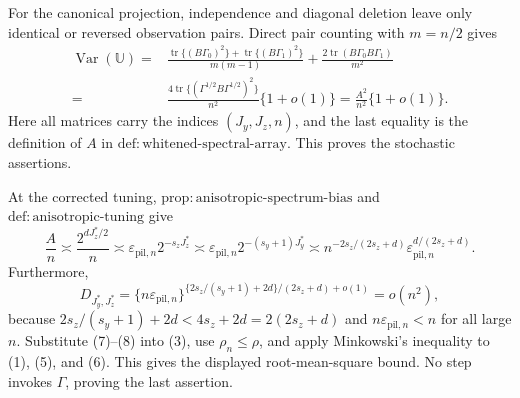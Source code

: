 For the canonical projection, independence and diagonal deletion leave only identical or reversed observation pairs. Direct pair counting with \(m=n/2\) gives
\[
\begin{split}
\operatorname{Var}(\mathbb U)
={}&\frac{\operatorname{tr}\{(B\Gamma_0)^2\}+\operatorname{tr}\{(B\Gamma_1)^2\}}{m(m-1)}
+\frac{2\operatorname{tr}(B\Gamma_0B\Gamma_1)}{m^2}\\
={}&\frac{4\operatorname{tr}\{(\Gamma^{1/2}B\Gamma^{1/2})^2\}}{n^2}\{1+o(1)\}
=\frac{A^2}{n^2}\{1+o(1)\}.
\end{split}\tag{6}
\]
Here all matrices carry the indices \((J_y,J_z,n)\), and the last equality is the definition of \(A\) in \(\mathrm{def{:}whitened\text{-}spectral\text{-}array}\). This proves the stochastic assertions.

At the corrected tuning, \(\mathrm{prop{:}anisotropic\text{-}spectrum\text{-}bias}\) and \(\mathrm{def{:}anisotropic\text{-}tuning}\) give
\[
\frac A n\asymp\frac{2^{dJ_z^*/2}}n
\asymp\varepsilon_{\mathrm{pil},n}2^{-s_zJ_z^*}
\asymp\varepsilon_{\mathrm{pil},n}2^{-(s_y+1)J_y^*}
\asymp n^{-2s_z/(2s_z+d)}\varepsilon_{\mathrm{pil},n}^{d/(2s_z+d)}. \tag{7}
\]
Furthermore,
\[
D_{J_y^*,J_z^*}
=\{n\varepsilon_{\mathrm{pil},n}\}^{\{2s_z/(s_y+1)+2d\}/(2s_z+d)+o(1)}=o(n^2), \tag{8}
\]
because \(2s_z/(s_y+1)+2d<4s_z+2d=2(2s_z+d)\) and \(n\varepsilon_{\mathrm{pil},n}<n\) for all large \(n\).  Substitute (7)--(8) into (3), use \(\rho_n\le\rho\), and apply Minkowski's inequality to (1), (5), and (6). This gives the displayed root-mean-square bound. No step invokes \(\widehat\Gamma\), proving the last assertion.